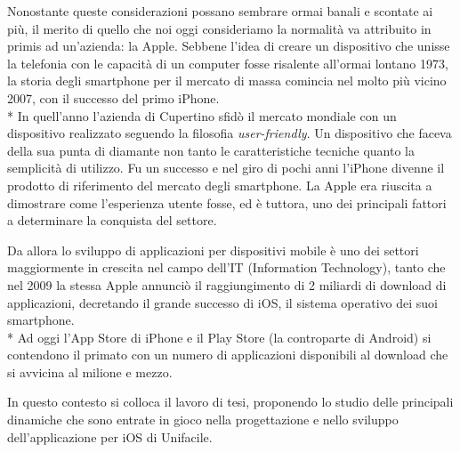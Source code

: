 Nonostante queste considerazioni possano sembrare ormai banali e scontate ai più, il merito di quello che noi oggi consideriamo la normalità va attribuito in primis ad un’azienda: la Apple. 
Sebbene l’idea di creare un dispositivo che unisse la telefonia con le capacità di un computer fosse risalente all’ormai lontano 1973, la storia degli smartphone per il mercato di massa comincia nel molto più vicino 2007, con il successo del primo iPhone. \\*
In quell’anno l’azienda di Cupertino sfidò il mercato mondiale con un dispositivo realizzato seguendo la filosofia \emph{user-friendly}. Un dispositivo che faceva della sua punta di diamante non tanto le caratteristiche tecniche quanto la semplicità di utilizzo. Fu un successo e nel giro di pochi anni l’iPhone divenne il prodotto di riferimento del mercato degli smartphone. La Apple era riuscita a dimostrare come l’esperienza utente fosse, ed è tuttora, uno dei principali fattori a determinare la conquista del settore.

Da allora lo sviluppo di applicazioni per dispositivi mobile è uno dei settori maggiormente in crescita nel campo dell’IT (Information Technology), tanto che nel 2009 la stessa Apple annunciò il raggiungimento di 2 miliardi di download di applicazioni, decretando il grande successo di iOS, il sistema operativo dei suoi smartphone. \\*
Ad oggi l’App Store di iPhone e il Play Store (la controparte di Android) si contendono il primato con un numero di applicazioni disponibili al download che si avvicina al milione e mezzo.

In questo contesto si colloca il lavoro di tesi, proponendo lo studio delle principali dinamiche che sono entrate in gioco nella progettazione e nello sviluppo dell’applicazione per iOS di Unifacile.

